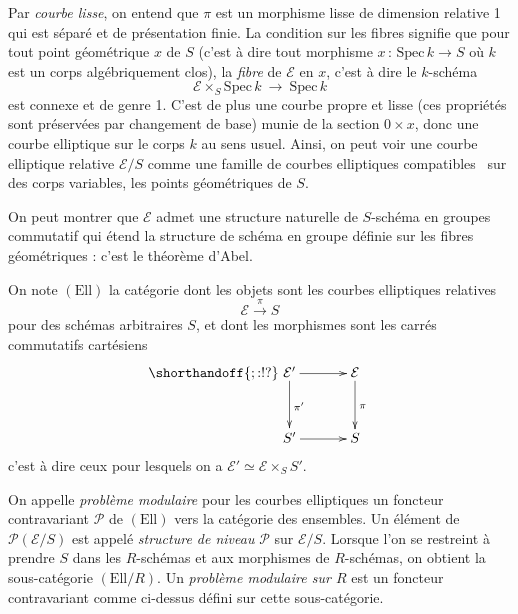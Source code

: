 \documentclass[11pt,a4paper]{article}
\newcommand{\E}{\mathcal{E}}
\renewcommand{\Pr}{\mathcal{P}}
\newcommand{\vers}{\longrightarrow}
\newcommand{\Ell}{\mathrm{Ell}}
\newcommand{\Spec}{\mathrm{Spec}\,}
\newcommand{\de}{\,:\,}
\renewcommand{\v}{\vspace{5mm}}
\theoremstyle{definition}
\begin{document}
Par \emph{courbe lisse}, on entend que $\pi$ est un morphisme lisse de dimension relative 1 qui est séparé et de présentation finie. La condition sur les fibres signifie que pour tout point géométrique $x$ de $S$ (c'est à dire tout morphisme $x\de\Spec k\vers S$ où $k$ est un corps algébriquement clos), la \emph{fibre} de $\E$ en $x$, c'est à dire le $k$-schéma
$$\E \times_S \Spec k\ \vers\ \Spec k$$
est connexe et de genre 1. C'est de plus une courbe propre et lisse (ces propriétés sont préservées par changement de base) munie de la section $0 \times x$, donc une courbe elliptique sur le corps $k$ au sens usuel. Ainsi, on peut voir une courbe elliptique relative $\E/S$ comme une famille de courbes elliptiques \og compatibles \fg\ sur des corps variables, les points géométriques de $S$.

On peut montrer que $\E$ admet une structure naturelle de $S$-schéma en groupes commutatif qui étend la structure de schéma en groupe définie sur les fibres géométriques : c'est le théorème d'Abel.
\v

On note $(\Ell)$ la catégorie dont les objets sont les courbes elliptiques relatives
$$\E \overset{\pi}{\vers} S$$
pour des schémas arbitraires $S$, et dont les morphismes sont les carrés commutatifs cartésiens
$$
\shorthandoff{;:!?}
\xymatrix @!=8mm {
\E' \ar[d]^{\pi'} \ar[r]  & \E \ar[d]^{\pi} \\
 S' \ar[r] & S
}
$$
c'est à dire ceux pour lesquels on a $\E' \simeq \E \times_S S'$.

On appelle \emph{problème modulaire} pour les courbes elliptiques un foncteur contravariant $\Pr$ de $(\Ell)$ vers la catégorie des ensembles. Un élément de $\Pr(\E/S)$ est appelé \emph{structure de niveau} $\Pr$ sur $\E/S$. Lorsque l'on se restreint à prendre $S$ dans les $R$-schémas et aux morphismes de $R$-schémas, on obtient la sous-catégorie $(\Ell/R)$. Un \emph{problème modulaire sur $R$} est un foncteur contravariant comme ci-dessus défini sur cette sous-catégorie.
\end{document}
